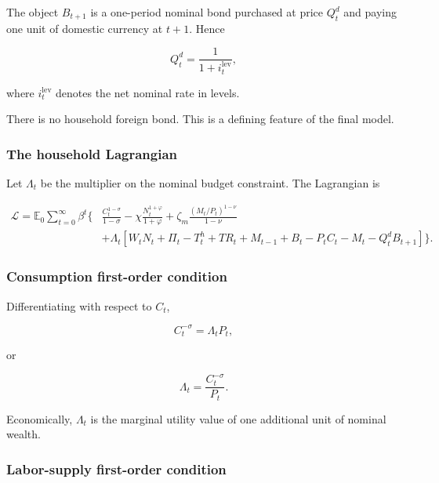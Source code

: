 The object \(B_{t+1}\) is a one-period nominal bond purchased at price
\(Q_t^d\) and paying one unit of domestic currency at \(t+1\). Hence

\begin{equation}
Q_t^d=\frac{1}{1+i_t^{\mathrm{lev}}},
\label{eq:bond_price}
\end{equation}

where \(i_t^{\mathrm{lev}}\) denotes the net nominal rate in levels.

There is no household foreign bond. This is a defining feature of the final
model.

\subsubsection{The household Lagrangian}

Let \(\Lambda_t\) be the multiplier on the nominal budget constraint. The
Lagrangian is

\begin{align}
\mathcal L
=
\mathbb E_0
\sum_{t=0}^{\infty}
\beta^t
\Bigg\{&
\frac{C_t^{1-\sigma}}{1-\sigma}
-
\chi\frac{N_t^{1+\varphi}}{1+\varphi}
+
\zeta_m\frac{(M_t/P_t)^{1-\nu}}{1-\nu}
\nonumber\\
&+
\Lambda_t
\left[
W_tN_t+\Pi_t-T_t^h+TR_t+M_{t-1}+B_t
-P_tC_t-M_t-Q_t^dB_{t+1}
\right]
\Bigg\}.
\label{eq:hh_lagrangian}
\end{align}

\subsubsection{Consumption first-order condition}

Differentiating with respect to \(C_t\),

\begin{equation}
C_t^{-\sigma}
=
\Lambda_tP_t,
\label{eq:foc_c}
\end{equation}

or

\begin{equation}
\Lambda_t
=
\frac{C_t^{-\sigma}}{P_t}.
\label{eq:lambda}
\end{equation}

Economically, \(\Lambda_t\) is the marginal utility value of one additional
unit of nominal wealth.

\subsubsection{Labor-supply first-order condition}

